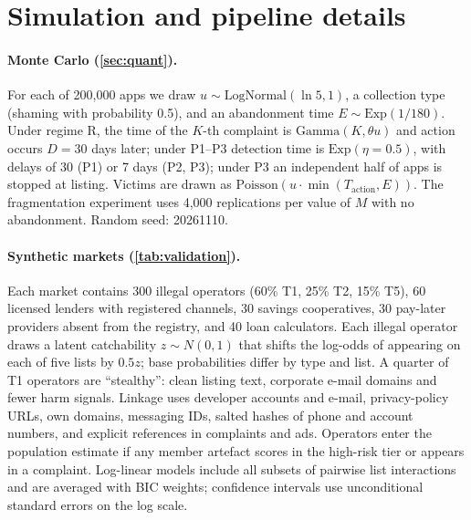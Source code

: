\documentclass[11pt]{article}
\theoremstyle{plain}
\theoremstyle{definition}
\theoremstyle{remark}
\begin{document}
\section{Simulation and pipeline details}\label{app:sim}

\paragraph{Monte Carlo (\cref{sec:quant}).} For each of 200,000 apps we draw $u \sim \text{LogNormal}(\ln 5, 1)$, a collection type (shaming with probability 0.5), and an abandonment time $E \sim \text{Exp}(1/180)$. Under regime R, the time of the $K$-th complaint is $\text{Gamma}(K, \theta u)$ and action occurs $D = 30$ days later; under P1--P3 detection time is $\text{Exp}(\eta = 0.5)$, with delays of 30 (P1) or 7 days (P2, P3); under P3 an independent half of apps is stopped at listing. Victims are drawn as $\text{Poisson}(u \cdot \min(T_{\text{action}}, E))$. The fragmentation experiment uses 4,000 replications per value of $M$ with no abandonment. Random seed: 20261110.

\paragraph{Synthetic markets (\cref{tab:validation}).} Each market contains 300 illegal operators (60\% T1, 25\% T2, 15\% T5), 60 licensed lenders with registered channels, 30 savings cooperatives, 30 pay-later providers absent from the registry, and 40 loan calculators. Each illegal operator draws a latent catchability $z \sim N(0,1)$ that shifts the log-odds of appearing on each of five lists by $0.5z$; base probabilities differ by type and list. A quarter of T1 operators are ``stealthy'': clean listing text, corporate e-mail domains and fewer harm signals. Linkage uses developer accounts and e-mail, privacy-policy URLs, own domains, messaging IDs, salted hashes of phone and account numbers, and explicit references in complaints and ads. Operators enter the population estimate if any member artefact scores in the high-risk tier or appears in a complaint. Log-linear models include all subsets of pairwise list interactions and are averaged with BIC weights; confidence intervals use unconditional standard errors on the log scale.
\end{document}
